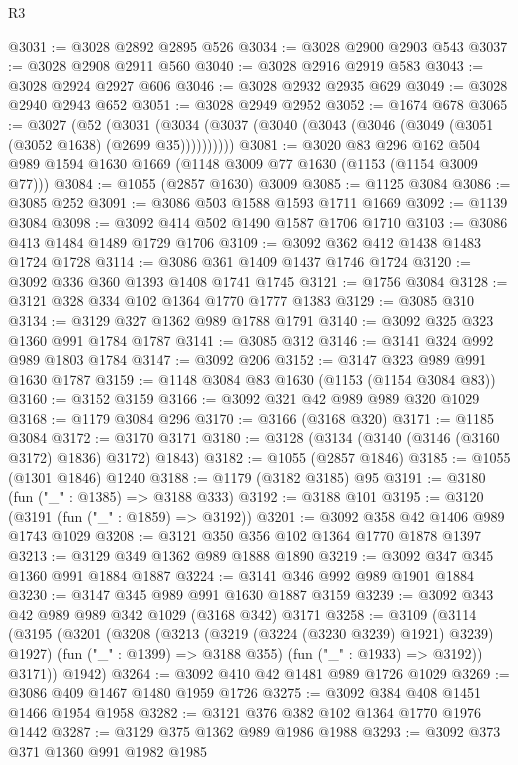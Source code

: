 \begin{lexlean}{R3}
\begin{coremodule}
@3031 := @3028 @2892 @2895 @526
@3034 := @3028 @2900 @2903 @543
@3037 := @3028 @2908 @2911 @560
@3040 := @3028 @2916 @2919 @583
@3043 := @3028 @2924 @2927 @606
@3046 := @3028 @2932 @2935 @629
@3049 := @3028 @2940 @2943 @652
@3051 := @3028 @2949 @2952
@3052 := @1674 @678
@3065 := @3027
    (@52 (@3031 (@3034 (@3037 (@3040 (@3043 (@3046 (@3049 (@3051 (@3052 @1638) (@2699 @35))))))))))
@3081 := @3020
    @83
    @296
    @162
    @504
    @989
    @1594
    @1630
    @1669
    (@1148 @3009 @77 @1630 (@1153 (@1154 @3009 @77)))
@3084 := @1055 (@2857 @1630) @3009
@3085 := @1125 @3084
@3086 := @3085 @252
@3091 := @3086 @503 @1588 @1593 @1711 @1669
@3092 := @1139 @3084
@3098 := @3092 @414 @502 @1490 @1587 @1706 @1710
@3103 := @3086 @413 @1484 @1489 @1729 @1706
@3109 := @3092 @362 @412 @1438 @1483 @1724 @1728
@3114 := @3086 @361 @1409 @1437 @1746 @1724
@3120 := @3092 @336 @360 @1393 @1408 @1741 @1745
@3121 := @1756 @3084
@3128 := @3121 @328 @334 @102 @1364 @1770 @1777 @1383
@3129 := @3085 @310
@3134 := @3129 @327 @1362 @989 @1788 @1791
@3140 := @3092 @325 @323 @1360 @991 @1784 @1787
@3141 := @3085 @312
@3146 := @3141 @324 @992 @989 @1803 @1784
@3147 := @3092 @206
@3152 := @3147 @323 @989 @991 @1630 @1787
@3159 := @1148 @3084 @83 @1630 (@1153 (@1154 @3084 @83))
@3160 := @3152 @3159
@3166 := @3092 @321 @42 @989 @989 @320 @1029
@3168 := @1179 @3084 @296
@3170 := @3166 (@3168 @320)
@3171 := @1185 @3084
@3172 := @3170 @3171
@3180 := @3128 (@3134 (@3140 (@3146 (@3160 @3172) @1836) @3172) @1843)
@3182 := @1055 (@2857 @1846)
@3185 := @1055 (@1301 @1846) @1240
@3188 := @1179 (@3182 @3185) @95
@3191 := @3180 (fun ("_" : @1385) => @3188 @333)
@3192 := @3188 @101
@3195 := @3120 (@3191 (fun ("_" : @1859) => @3192))
@3201 := @3092 @358 @42 @1406 @989 @1743 @1029
@3208 := @3121 @350 @356 @102 @1364 @1770 @1878 @1397
@3213 := @3129 @349 @1362 @989 @1888 @1890
@3219 := @3092 @347 @345 @1360 @991 @1884 @1887
@3224 := @3141 @346 @992 @989 @1901 @1884
@3230 := @3147 @345 @989 @991 @1630 @1887 @3159
@3239 := @3092 @343 @42 @989 @989 @342 @1029 (@3168 @342) @3171
@3258 := @3109
    (@3114
      (@3195
        (@3201
          (@3208
            (@3213 (@3219 (@3224 (@3230 @3239) @1921) @3239) @1927)
            (fun ("_" : @1399) => @3188 @355)
            (fun ("_" : @1933) => @3192))
          @3171))
      @1942)
@3264 := @3092 @410 @42 @1481 @989 @1726 @1029
@3269 := @3086 @409 @1467 @1480 @1959 @1726
@3275 := @3092 @384 @408 @1451 @1466 @1954 @1958
@3282 := @3121 @376 @382 @102 @1364 @1770 @1976 @1442
@3287 := @3129 @375 @1362 @989 @1986 @1988
@3293 := @3092 @373 @371 @1360 @991 @1982 @1985

\end{coremodule}
\end{lexlean}
